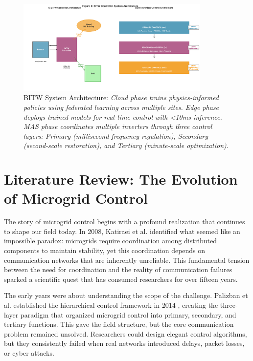 \documentclass[12pt]{article}
\begin{document}
\begin{figure}[H]
\centering
\includegraphics[width=0.85\textwidth]{figure3_system_architecture.pdf}
\caption{BITW System Architecture: \textit{Cloud phase trains physics-informed policies using federated learning across multiple sites. Edge phase deploys trained models for real-time control with <10ms inference. MAS phase coordinates multiple inverters through three control layers: Primary (millisecond frequency regulation), Secondary (second-scale restoration), and Tertiary (minute-scale optimization).}}
\end{figure}

\section{Literature Review: The Evolution of Microgrid Control}

The story of microgrid control begins with a profound realization that continues to shape our field today. In 2008, Katiraei et al. \cite{katiraei2008} identified what seemed like an impossible paradox: microgrids require coordination among distributed components to maintain stability, yet this coordination depends on communication networks that are inherently unreliable. This fundamental tension between the need for coordination and the reality of communication failures sparked a scientific quest that has consumed researchers for over fifteen years.

The early years were about understanding the scope of the challenge. Palizban et al. established the hierarchical control framework in 2014 \cite{palizban2014}, creating the three-layer paradigm that organized microgrid control into primary, secondary, and tertiary functions. This gave the field structure, but the core communication problem remained unsolved. Researchers could design elegant control algorithms, but they consistently failed when real networks introduced delays, packet losses, or cyber attacks.
\end{document}
